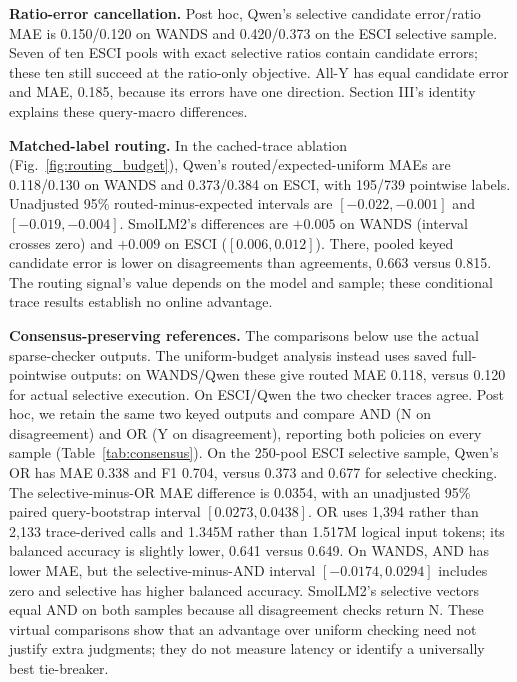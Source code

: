 \documentclass[conference]{IEEEtran}
\begin{document}
\textbf{Ratio-error cancellation.} Post hoc, Qwen's selective candidate error/ratio MAE is 0.150/0.120 on WANDS and 0.420/0.373 on the ESCI selective sample. Seven of ten ESCI pools with exact selective ratios contain candidate errors; these ten still succeed at the ratio-only objective. All-Y has equal candidate error and MAE, 0.185, because its errors have one direction. Section III's identity explains these query-macro differences.

\textbf{Matched-label routing.} In the cached-trace ablation (Fig.~\ref{fig:routing_budget}), Qwen's routed/expected-uniform MAEs are 0.118/0.130 on WANDS and 0.373/0.384 on ESCI, with 195/739 pointwise labels. Unadjusted 95\% routed-minus-expected intervals are $[-0.022,-0.001]$ and $[-0.019,-0.004]$. SmolLM2's differences are $+0.005$ on WANDS (interval crosses zero) and $+0.009$ on ESCI ($[0.006,0.012]$). There, pooled keyed candidate error is lower on disagreements than agreements, 0.663 versus 0.815. The routing signal's value depends on the model and sample; these conditional trace results establish no online advantage.

\textbf{Consensus-preserving references.} The comparisons below use the actual sparse-checker outputs. The uniform-budget analysis instead uses saved full-pointwise outputs: on WANDS/Qwen these give routed MAE 0.118, versus 0.120 for actual selective execution. On ESCI/Qwen the two checker traces agree. 
Post hoc, we retain the same two keyed outputs and compare AND (N on disagreement)
and OR (Y on disagreement), reporting both policies on every sample
(Table~\ref{tab:consensus}). On the 250-pool ESCI selective sample, Qwen's OR has MAE 0.338 and F1 0.704,
versus 0.373 and 0.677 for selective checking. The selective-minus-OR MAE
difference is 0.0354, with an unadjusted 95\% paired query-bootstrap interval
$[0.0273,0.0438]$. OR uses 1,394 rather than 2,133 trace-derived calls and
1.345M rather than 1.517M logical input tokens; its balanced accuracy is
slightly lower, 0.641 versus 0.649. On WANDS, AND has lower MAE, but the
selective-minus-AND interval $[-0.0174,0.0294]$ includes zero and selective
has higher balanced accuracy. SmolLM2's selective vectors equal AND on both
samples because all disagreement checks return N. These virtual comparisons
show that an advantage over uniform checking need not justify extra judgments;
they do not measure latency or identify a universally best tie-breaker.
\end{document}

